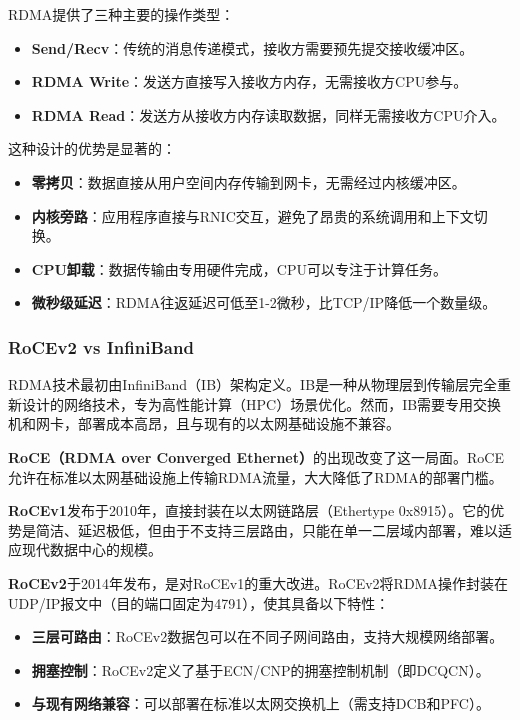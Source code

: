 RDMA提供了三种主要的操作类型：

\begin{itemize}
    \item \textbf{Send/Recv}：传统的消息传递模式，接收方需要预先提交接收缓冲区。
    \item \textbf{RDMA Write}：发送方直接写入接收方内存，无需接收方CPU参与。
    \item \textbf{RDMA Read}：发送方从接收方内存读取数据，同样无需接收方CPU介入。
\end{itemize}

这种设计的优势是显著的：
\begin{itemize}
    \item \textbf{零拷贝}：数据直接从用户空间内存传输到网卡，无需经过内核缓冲区。
    \item \textbf{内核旁路}：应用程序直接与RNIC交互，避免了昂贵的系统调用和上下文切换。
    \item \textbf{CPU卸载}：数据传输由专用硬件完成，CPU可以专注于计算任务。
    \item \textbf{微秒级延迟}：RDMA往返延迟可低至1-2微秒，比TCP/IP降低一个数量级。
\end{itemize}

\subsubsection{RoCEv2 vs InfiniBand}

RDMA技术最初由InfiniBand（IB）架构定义。IB是一种从物理层到传输层完全重新设计的网络技术，专为高性能计算（HPC）场景优化。然而，IB需要专用交换机和网卡，部署成本高昂，且与现有的以太网基础设施不兼容。

\textbf{RoCE（RDMA over Converged Ethernet）}的出现改变了这一局面。RoCE允许在标准以太网基础设施上传输RDMA流量，大大降低了RDMA的部署门槛。

\textbf{RoCEv1}发布于2010年，直接封装在以太网链路层（Ethertype 0x8915）。它的优势是简洁、延迟极低，但由于不支持三层路由，只能在单一二层域内部署，难以适应现代数据中心的规模。

\textbf{RoCEv2}于2014年发布，是对RoCEv1的重大改进。RoCEv2将RDMA操作封装在UDP/IP报文中（目的端口固定为4791），使其具备以下特性：

\begin{itemize}
    \item \textbf{三层可路由}：RoCEv2数据包可以在不同子网间路由，支持大规模网络部署。
    \item \textbf{拥塞控制}：RoCEv2定义了基于ECN/CNP的拥塞控制机制（即DCQCN）。
    \item \textbf{与现有网络兼容}：可以部署在标准以太网交换机上（需支持DCB和PFC）。
\end{itemize}


